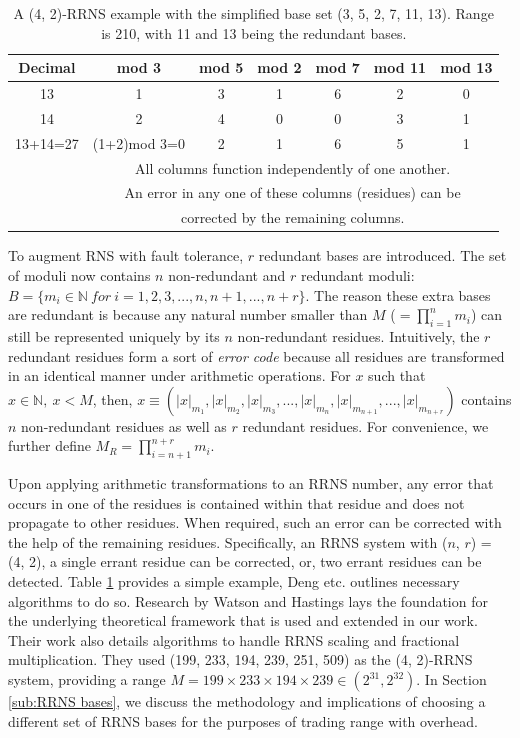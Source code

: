 \documentclass{sig-alternate}
\begin{document}
\begin{table}
\centering{}
\footnotesize
\captionsetup{justification=centering}
\caption{\label{tab:RRNS}A (4, 2)-RRNS example with the simplified base set (3, 5, 
2, 7, 11, 13). \newline Range is 210, with 11 and  13 being the redundant bases.}
\begin{tabular}{|c|c|c|c|c|c|c|}
\hline 
Decimal & mod 3 & mod 5 & mod 2 & mod 7 & mod 11 & mod 13\tabularnewline
\hline 
\hline 
13 & 1 & 3 & 1 & 6 & 2 & 0\tabularnewline
\hline 
14 & 2 & 4 & 0 & 0 & 3 & 1\tabularnewline
\hline 
13+14=27 & (1+2)mod 3=0 & 2 & 1 & 6 & 5 & 1\tabularnewline
\hline 
 & \multicolumn{6}{c|}{All columns function independently of one another. }\tabularnewline
\cline{2-7} 
 & \multicolumn{6}{c|}{An error in any one of these columns (residues) can be}\tabularnewline
 & \multicolumn{6}{c|}{corrected by the remaining columns.}\tabularnewline
\hline 
\end{tabular}

\end{table}


To augment RNS with fault tolerance, $r$ redundant bases are introduced. The set of moduli now contains $n$ non-redundant and $r$ redundant moduli: $B=\{m_i\in\mathbb{N}~for~i = 1,2,3,...,n,n+1,...,n+r\}$. The reason these extra bases are redundant is because any natural number smaller than $M$ ($=\prod_{i=1}^{n}m_i$) can still be represented uniquely by its $n$ non-redundant residues. Intuitively, the $r$ redundant residues form a sort of \textit{error code} because all residues are transformed in an identical manner under arithmetic operations. For $x$ such that $x\in\mathbb{N},~x < M$, then, $x \equiv (|x|_{m_1}, |x|_{m_2}, |x|_{m_3}, ..., |x|_{m_n}, |x|_{m_{n+1}}, ..., |x|_{m_{n+r}})$ contains $n$ non-redundant residues as well as $r$ redundant residues. For convenience, we further define $M_R = \prod_{i=n+1}^{n+r}m_i$. 

Upon applying arithmetic transformations to an RRNS number, any error that occurs in one of the residues is contained within that residue and does not propagate to other residues. When required, such an error can be corrected with the help of the remaining residues. Specifically, an RRNS system with ($n$, $r$) = (4, 2), a single errant residue can be corrected, or, two errant residues can be detected. Table \ref{tab:RRNS} provides a simple example, Deng etc. \cite{DengTACO18} outlines necessary algorithms to do so. Research by Watson and Hastings  \cite{Hastings, WatsonThesis, WatsonHastings} lays the foundation for the underlying theoretical framework that is used and extended in our work. Their work also details algorithms to handle RRNS scaling and fractional multiplication. They used (199, 233, 194, 239, 251, 509) as the (4, 2)-RRNS system, providing a range $M = 199\times 233\times 194\times 239 \in (2^{31}, 2^{32})$. In Section \ref{sub:RRNS bases}, we discuss the methodology and implications of choosing a different set of RRNS bases for the purposes of trading range with overhead.
\end{document}
